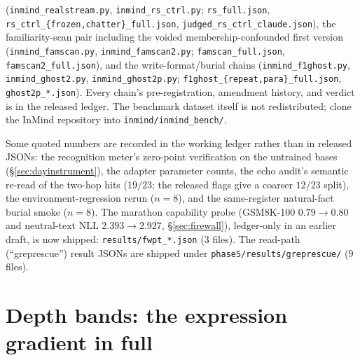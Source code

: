 \documentclass[11pt]{article}
\begin{document}
\begin{description}
(\texttt{inmind\_realstream.py}, \texttt{inmind\_rs\_ctrl.py}; \texttt{rs\_full.json},
\texttt{rs\_ctrl\_\{frozen,chatter\}\_full.json}, \texttt{judged\_rs\_ctrl\_claude.json}),
the familiarity-scan pair including
the voided membership-confounded first version (\texttt{inmind\_famscan.py},
\texttt{inmind\_famscan2.py}; \texttt{famscan\_full.json}, \texttt{famscan2\_full.json}), and
the write-format/burial chains (\texttt{inmind\_f1ghost.py}, \texttt{inmind\_ghost2.py},
\texttt{inmind\_ghost2p.py}; \texttt{f1ghost\_\{repeat,para\}\_full.json},
\texttt{ghost2p\_*.json}). Every chain's pre-registration, amendment history, and verdict is
in the released ledger. The benchmark
dataset itself is not redistributed; clone the InMind repository into
\texttt{inmind/inmind\_bench/}.
\item[Ledger-recorded values.] Some quoted numbers are recorded in the working ledger
rather than in released JSONs: the recognition meter's zero-point verification on the untrained
bases (\S\ref{sec:dayinstrument}), the adapter parameter counts, the echo audit's semantic
re-read of the two-hop hits ($19/23$; the released flags give a coarser $12/23$ split), the
environment-regression rerun ($n{=}8$), and the same-register natural-fact burial smoke
($n{=}8$). The marathon capability
probe (GSM8K-100 $0.79\to0.80$ and neutral-text NLL $2.393\to2.927$, \S\ref{sec:firewall}),
ledger-only in an earlier draft, is now shipped: \texttt{results/fwpt\_*.json} (3 files). The
read-path
(``greprescue'') result JSONs are shipped under \texttt{phase5/results/greprescue/} (9 files).
\end{description}
\endgroup

\section{Depth bands: the expression gradient in full}\label{app:depth}
\end{document}
